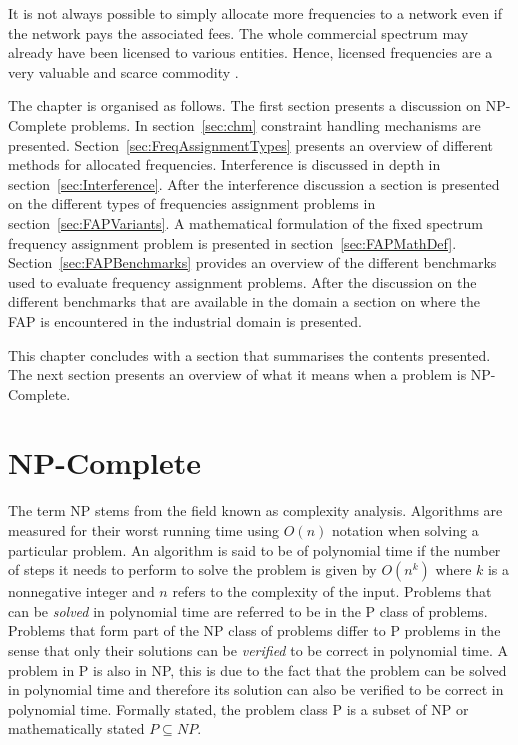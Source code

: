 It is not always possible to simply allocate more frequencies to a network even if the network pays the associated fees. The whole commercial spectrum may already have been licensed to various entities. Hence, licensed frequencies are a very valuable and scarce commodity \cite{FAPRAMColouring,FAPInCell}.

The chapter is organised as follows. The first section presents a discussion on NP-Complete problems. In section~\ref{sec:chm} constraint handling mechanisms are presented. Section~\ref{sec:FreqAssignmentTypes} presents an overview of different methods for allocated frequencies. Interference is discussed in depth in section~\ref{sec:Interference}. After the interference discussion a section is presented on the different types of frequencies assignment problems in section~\ref{sec:FAPVariants}. A mathematical formulation of the fixed spectrum frequency assignment problem is presented in section~\ref{sec:FAPMathDef}. Section~\ref{sec:FAPBenchmarks} provides an overview of the different benchmarks used to evaluate frequency assignment problems. After the discussion on the different benchmarks that are available in the domain a section on where the FAP is encountered in the industrial domain is presented. 

This chapter concludes with a section that summarises the contents presented. The next section presents an overview of what it means when a problem is NP-Complete.

\section{NP-Complete}
\label{sec:NPComplete}
The term NP stems from the field known as complexity analysis. Algorithms are measured for their worst running time using $O(n)$ notation when solving a particular problem.
An algorithm is said to be of polynomial time if the number of steps it needs to perform to solve the problem is given by $O(n^k)$ where $k$ is a nonnegative integer and $n$ refers to the complexity of the input\cite{AIModernApproach}.
Problems that can be \emph{solved} in polynomial time are referred to be in the P class of problems. Problems that form part of the NP class of problems differ to P problems in the sense that only their solutions can be \emph{verified} to be correct in polynomial time\cite{IntroToAlgos}. 
A problem in P is also in NP, this is due to the fact that the problem can be solved in polynomial time and therefore its solution can also be verified to be correct in polynomial time. Formally stated, the problem class P is a subset of NP or mathematically stated $P \subseteq NP$\cite{IntroToAlgos}.

